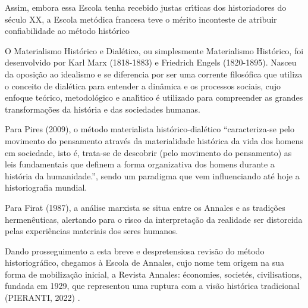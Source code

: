 \documentclass[
12pt,		%
openright,	%
twoside,  %
a4paper,			%
chapter=TITLE,		%
english,			%
french,				%
spanish,			%
brazil				%
]{USPSC-classe/USPSC}
\begin{document}
Assim, embora essa Escola tenha recebido justas cr\'{\i}ticas dos historiadores do s\'eculo XX, a Escola met\'odica francesa teve o m\'erito inconteste de atribuir confiabilidade ao m\'etodo hist\'orico










O Materialismo Hist\'orico e Dial\'etico, ou simplesmente Materialismo Hist\'orico, foi desenvolvido  por Karl Marx (1818-1883) e Friedrich Engels (1820-1895). Nasceu da oposi\c{c}\~ao ao idealismo e se diferencia por ser uma corrente filos\'ofica que utiliza o conceito de dial\'etica para entender a din\^amica e os processos sociais, cujo enfoque te\'orico, metodol\'ogico e anal\'{\i}tico \'e utilizado para compreender as grandes transforma\c{c}\~oes da hist\'oria e das sociedades humanas.










Para  Pires (2009), o m\'etodo materialista hist\'orico-dial\'etico “caracteriza-se pelo movimento do pensamento atrav\'es da materialidade hist\'orica da vida dos homens em sociedade, isto \'e, trata-se de descobrir (pelo movimento do pensamento) as leis fundamentais que definem a forma organizativa dos homens durante a hist\'oria da humanidade.”, sendo um paradigma que vem influenciando at\'e hoje a historiografia mundial.










Para Firat (1987), \textquotedbl a an\'alise marxista se situa entre os Annales e as tradi\c{c}\~oes hermen\^euticas\textquotedbl , alertando para o risco da interpreta\c{c}\~ao da realidade ser distorcida pelas \textquotedbl experi\^encias materiais dos seres humanos\textquotedbl .










Dando prosseguimento a esta breve e despretensiosa revis\~ao do m\'etodo historiogr\'afico, chegamos \`a Escola de Annales, cujo nome tem origem na sua forma de mobiliza\c{c}\~ao inicial, a Revista Annales: \'economies, societ\'es, civilisations, fundada em 1929, que representou uma ruptura com a vis\~ao hist\'orica tradicional (PIERANTI, 2022) .
\end{document}
